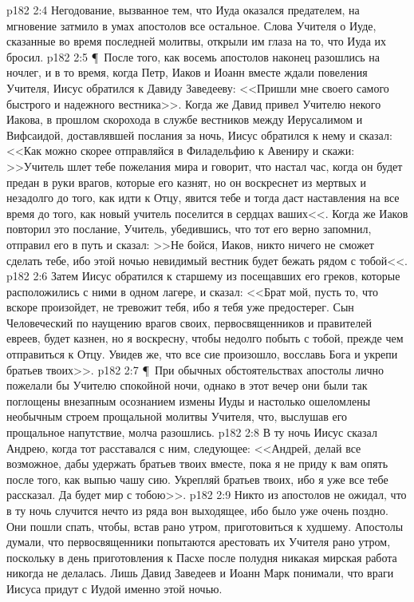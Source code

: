 \vs p182 2:4 Негодование, вызванное тем, что Иуда оказался предателем, на мгновение затмило в умах апостолов все остальное. Слова Учителя о Иуде, сказанные во время последней молитвы, открыли им глаза на то, что Иуда их бросил.
\vs p182 2:5 \P\ После того, как восемь апостолов наконец разошлись на ночлег, и в то время, когда Петр, Иаков и Иоанн вместе ждали повеления Учителя, Иисус обратился к Давиду Заведееву: <<Пришли мне своего самого быстрого и надежного вестника>>. Когда же Давид привел Учителю некого Иакова, в прошлом скорохода в службе вестников между Иерусалимом и Вифсаидой, доставлявшей послания за ночь, Иисус обратился к нему и сказал: <<Как можно скорее отправляйся в Филадельфию к Авениру и скажи: >>Учитель шлет тебе пожелания мира и говорит, что настал час, когда он будет предан в руки врагов, которые его казнят, но он воскреснет из мертвых и незадолго до того, как идти к Отцу, явится тебе и тогда даст наставления на все время до того, как новый учитель поселится в сердцах ваших<<. Когда же Иаков повторил это послание, Учитель, убедившись, что тот его верно запомнил, отправил его в путь и сказал: >>Не бойся, Иаков, никто ничего не сможет сделать тебе, ибо этой ночью невидимый вестник будет бежать рядом с тобой<<.
\vs p182 2:6 Затем Иисус обратился к старшему из посещавших его греков, которые расположились с ними в одном лагере, и сказал: <<Брат мой, пусть то, что вскоре произойдет, не тревожит тебя, ибо я тебя уже предостерег. Сын Человеческий по наущению врагов своих, первосвященников и правителей евреев, будет казнен, но я воскресну, чтобы недолго побыть с тобой, прежде чем отправиться к Отцу. Увидев же, что все сие произошло, восславь Бога и укрепи братьев твоих>>.
\vs p182 2:7 \P\ При обычных обстоятельствах апостолы лично пожелали бы Учителю спокойной ночи, однако в этот вечер они были так поглощены внезапным осознанием измены Иуды и настолько ошеломлены необычным строем прощальной молитвы Учителя, что, выслушав его прощальное напутствие, молча разошлись.
\vs p182 2:8 В ту ночь Иисус сказал Андрею, когда тот расставался с ним, следующее: <<Андрей, делай все возможное, дабы удержать братьев твоих вместе, пока я не приду к вам опять после того, как выпью чашу сию. Укрепляй братьев твоих, ибо я уже все тебе рассказал. Да будет мир с тобою>>.
\vs p182 2:9 Никто из апостолов не ожидал, что в ту ночь случится нечто из ряда вон выходящее, ибо было уже очень поздно. Они пошли спать, чтобы, встав рано утром, приготовиться к худшему. Апостолы думали, что первосвященники попытаются арестовать их Учителя рано утром, поскольку в день приготовления к Пасхе после полудня никакая мирская работа никогда не делалась. Лишь Давид Заведеев и Иоанн Марк понимали, что враги Иисуса придут с Иудой именно этой ночью.

